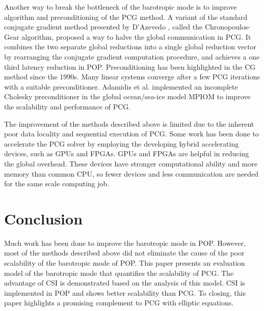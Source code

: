 Another way to break the bottleneck of the barotropic mode is to improve algorithm and preconditioning of the PCG method. 
A variant of the standard conjugate gradient method presented by D'Azevedo \cite{dAzevedo1999lapack}, called the Chronopoulos-Gear algorithm, proposed a way to halve the global communication in PCG.  It combines the two separate global reductions into a single global reduction vector by rearranging the conjugate gradient computation procedure, and achieves a one third latency reduction in POP. Preconditioning has been highlighted in the CG method since the 1990s. Many linear systems converge after a few PCG iterations with a suitable preconditioner.  Adamidis et al. \cite{adamidis2011high} implemented an incomplete Cholesky preconditioner in the global ocean/sea-ice model MPIOM to improve the scalability and performance of PCG.

The improvement of the methods described above is limited due to the inherent poor data locality and sequential execution of PCG. Some work has been done to accelerate the PCG solver by employing the developing hybrid  accelerating devices, such as GPUs\cite{cuomo2012pcg} and FPGAs\cite{Shida2007}. 
GPUs and FPGAs are helpful in reducing the global overhead. These devices have stronger computational ability and more memory than common CPU, so fewer devices and less communication are needed for the same scale computing job.
\section{Conclusion} \label{se:conc}
Much work has been done to improve the barotropic mode in POP. However, most of the methods described above did not eliminate the cause of the poor scalability of the barotropic mode of POP. This paper presents an evaluation model of the barotropic mode that quantifies the scalability of PCG. The advantage of CSI is demonstrated based on the analysis of this model. CSI is implemented in POP and shows better scalability than PCG. To closing, this paper highlights a promising complement to PCG with elliptic equations.






